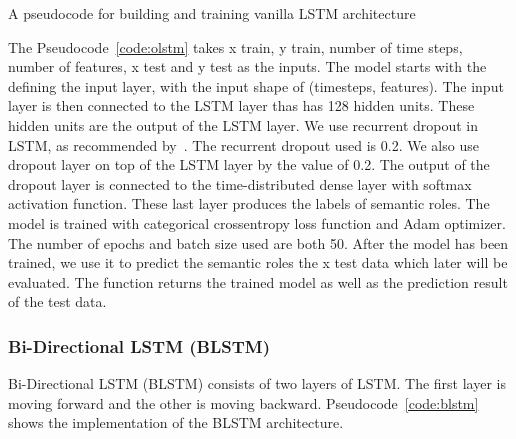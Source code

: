 \begin{kode}

	
	\caption{A pseudocode for building and training vanilla LSTM architecture}
	\label{code:olstm}
\end{kode}

The Pseudocode~\ref{code:olstm} takes x train, y train, number of time steps, number of features, x test and y test as the inputs. The model starts with the defining the input layer, with the input shape of (timesteps, features). The input layer is then connected to the LSTM layer thas has 128 hidden units. These hidden units are the output of the LSTM layer. We use recurrent dropout in LSTM, as recommended by~\cite{he2017deep}. The recurrent dropout used is 0.2. We also use dropout layer on top of the LSTM layer by the value of 0.2. The output of the dropout layer is connected to the time-distributed dense layer with softmax activation function. These last layer produces the labels of semantic roles. The model is trained with categorical crossentropy loss function and Adam optimizer. The number of epochs and batch size used are both 50. After the model has been trained, we use it to predict the semantic roles the x test data which later will be evaluated. The function returns the trained model as well as the prediction result of the test data.

\subsubsection{Bi-Directional LSTM (BLSTM)}
Bi-Directional LSTM (BLSTM) consists of two layers of LSTM. The first layer is moving forward and the other is moving backward. Pseudocode~\ref{code:blstm} shows the implementation of the BLSTM architecture.

